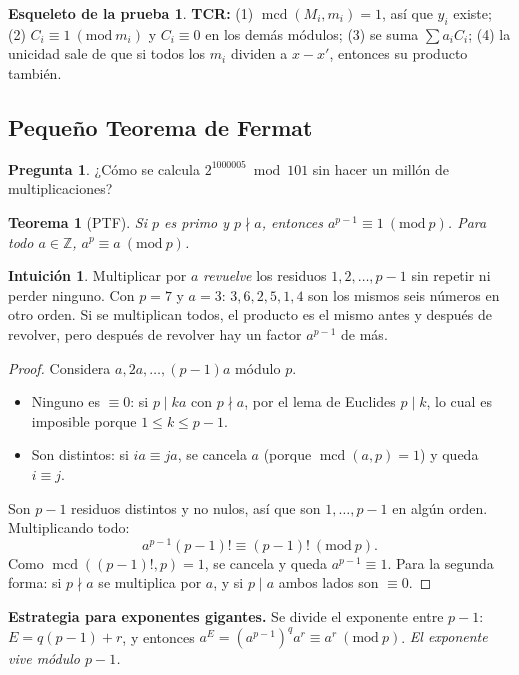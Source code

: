 \documentclass[11pt,a4paper]{article}
\newtheorem{teorema}{Teorema}[section]
\theoremstyle{definition}
\newcommand{\Z}{\mathbb{Z}}
\newcommand{\md}[1]{\ (\mathrm{mod}\ #1)}
\newcommand{\mcd}{\operatorname{mcd}}
\theoremstyle{notait}
\newtheorem*{pregunta}{Pregunta}
\theoremstyle{nota}
\newtheorem*{intuicion}{Intuición}
\newtheorem*{esqueleto}{Esqueleto de la prueba}
\begin{document}
\begin{esqueleto}
\textbf{TCR:} (1) $\mcd(M_i,m_i)=1$, así que $y_i$ existe; (2) $C_i\equiv1\md{m_i}$ y $C_i\equiv0$ en los demás módulos; (3) se suma $\sum a_iC_i$; (4) la unicidad sale de que si todos los $m_i$ dividen a $x-x'$, entonces su producto también.
\end{esqueleto}

\subsection{Pequeño Teorema de Fermat}

\begin{pregunta}
¿Cómo se calcula $2^{1000005}\bmod101$ sin hacer un millón de multiplicaciones?
\end{pregunta}

\begin{teorema}[PTF]
Si $p$ es primo y $p\nmid a$, entonces $a^{p-1}\equiv1\md p$. Para todo $a\in\Z$, $a^p\equiv a\md p$.
\end{teorema}

\begin{intuicion}
Multiplicar por $a$ \emph{revuelve} los residuos $1,2,\dots,p-1$ sin repetir ni perder ninguno. Con $p=7$ y $a=3$: $3,6,2,5,1,4$ son los mismos seis números en otro orden. Si se multiplican todos, el producto es el mismo antes y después de revolver, pero después de revolver hay un factor $a^{p-1}$ de más.
\end{intuicion}

\begin{proof}
Considera $a,2a,\dots,(p-1)a$ módulo $p$.
\begin{itemize}
\item Ninguno es $\equiv0$: si $p\mid ka$ con $p\nmid a$, por el lema de Euclides $p\mid k$, lo cual es imposible porque $1\le k\le p-1$.
\item Son distintos: si $ia\equiv ja$, se cancela $a$ (porque $\mcd(a,p)=1$) y queda $i\equiv j$.
\end{itemize}
Son $p-1$ residuos distintos y no nulos, así que son $1,\dots,p-1$ en algún orden. Multiplicando todo:
\[
a^{p-1}(p-1)!\equiv(p-1)!\md p.
\]
Como $\mcd((p-1)!,p)=1$, se cancela y queda $a^{p-1}\equiv1$. Para la segunda forma: si $p\nmid a$ se multiplica por $a$, y si $p\mid a$ ambos lados son $\equiv0$.
\end{proof}

\textbf{Estrategia para exponentes gigantes.} Se divide el exponente entre $p-1$: $E=q(p-1)+r$, y entonces $a^E=(a^{p-1})^q a^r\equiv a^r\md p$. \emph{El exponente vive módulo $p-1$.}
\end{document}
